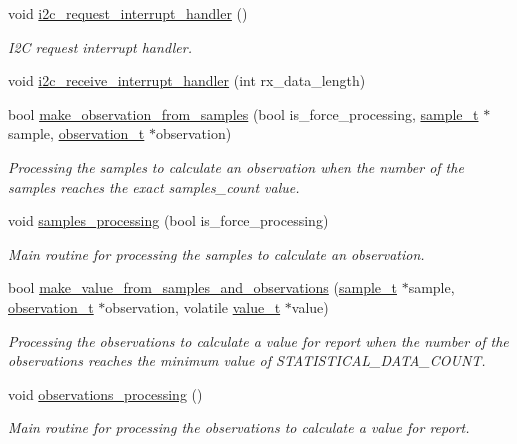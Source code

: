 \begin{DoxyCompactItemize}
void \hyperlink{i2c-th_8ino_ac816bd8aafe77e7a571574c8a26eead5}{i2c\+\_\+request\+\_\+interrupt\+\_\+handler} ()
\begin{DoxyCompactList}\small\item\em I2C request interrupt handler. \end{DoxyCompactList}\item 
void \hyperlink{i2c-th_8ino_a6e27532df66f6bf186654355def5c9af}{i2c\+\_\+receive\+\_\+interrupt\+\_\+handler} (int rx\+\_\+data\+\_\+length)
\item 
bool \hyperlink{i2c-th_8ino_a1c5769e114267b210fb3812064d01dd0}{make\+\_\+observation\+\_\+from\+\_\+samples} (bool is\+\_\+force\+\_\+processing, \hyperlink{structsample__t}{sample\+\_\+t} $\ast$sample, \hyperlink{structobservation__t}{observation\+\_\+t} $\ast$observation)
\begin{DoxyCompactList}\small\item\em Processing the samples to calculate an observation when the number of the samples reaches the exact samples\+\_\+count value. \end{DoxyCompactList}\item 
void \hyperlink{i2c-th_8ino_aba0fc91d6c2829df00a9d5fe2b921c90}{samples\+\_\+processing} (bool is\+\_\+force\+\_\+processing)
\begin{DoxyCompactList}\small\item\em Main routine for processing the samples to calculate an observation. \end{DoxyCompactList}\item 
bool \hyperlink{i2c-th_8ino_ab301e4d552826ef91458f52963949a1d}{make\+\_\+value\+\_\+from\+\_\+samples\+\_\+and\+\_\+observations} (\hyperlink{structsample__t}{sample\+\_\+t} $\ast$sample, \hyperlink{structobservation__t}{observation\+\_\+t} $\ast$observation, volatile \hyperlink{structvalue__t}{value\+\_\+t} $\ast$value)
\begin{DoxyCompactList}\small\item\em Processing the observations to calculate a value for report when the number of the observations reaches the minimum value of S\+T\+A\+T\+I\+S\+T\+I\+C\+A\+L\+\_\+\+D\+A\+T\+A\+\_\+\+C\+O\+U\+NT. \end{DoxyCompactList}\item 
void \hyperlink{i2c-th_8ino_a4c8e037e3b3f4c043abf3de8cf57fe68}{observations\+\_\+processing} ()
\begin{DoxyCompactList}\small\item\em Main routine for processing the observations to calculate a value for report. \end{DoxyCompactList}\item 

\end{DoxyCompactItemize}
